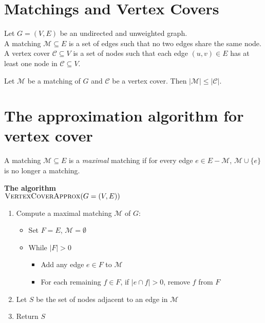 \documentclass[11  pt]{article}
\begin{document}
	\newpage
	\section{Matchings and Vertex Covers}
	Let $G = (V,E)$ be an undirected and unweighted graph. \\
	
	A matching $\mathcal{M} \subseteq E$ is a set of edges such that no two edges share the same node. \\ 
	
	A vertex cover $\mathcal{C} \subseteq V$ is a set of nodes such that each edge $(u,v) \in E$ has at least one node in $\mathcal{C} \subseteq V$.\\
	\vspace{5cm} 
	
	
	\begin{lemma}
		Let $\mathcal{M}$ be a matching of $G$ and $\mathcal{C}$ be a vertex cover. Then $|\mathcal{M}| \leq |\mathcal{C}|$.
	\end{lemma}

	
	

	
	\newpage
	\section{The approximation algorithm for vertex cover}
	A matching $\mathcal{M} \subseteq E$ is a \emph{maximal} matching if for every edge $e \in E - \mathcal{M}$, $\mathcal{M} \cup \{e\}$ is no longer a matching. \\
	
	
	\vspace{8cm}
	
	
	\textbf{The algorithm}\\
	
	$\textsc{VertexCoverApprox}(G = (V,E))$
	\begin{enumerate}
		\item Compute a maximal matching $\mathcal{M}$ of $G$:
		\begin{itemize}
			\item Set $F = E$, $\mathcal{M} = \emptyset$
			\item While $|F| > 0$
			\begin{itemize}
				\item Add any edge $e \in F$ to $\mathcal{M}$
				\item For each remaining $f \in F$, if $|e \cap f| > 0$, remove $f$ from $F$
			\end{itemize}
		\end{itemize}
		\item Let $S$ be the set of nodes adjacent to an edge in $\mathcal{M}$
		\item Return $S$\\
	\end{enumerate}
	
\end{document}
